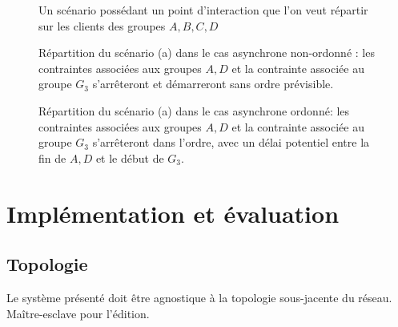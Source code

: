 \documentclass{article}
\newcommand\trigger{point d'interaction\xspace}
\begin{document}
\begin{figure}[h]
	\centering
		\begin{tikzpicture}
		
		\end{tikzpicture}
		\caption{Un scénario possédant un \trigger que l'on veut répartir sur les clients des groupes $A,B,C,D$}
	\label{scenar.depl-interactif}
\end{figure}
\begin{figure}[h]
	\centering
		\caption{Répartition du scénario (a) dans le cas asynchrone non-ordonné : les contraintes associées aux groupes $A,D$ et la contrainte associée au groupe $G_3$ s'arrêteront et démarreront sans ordre prévisible.}
\end{figure}
\begin{figure}[h]
	\centering
		\caption{Répartition du scénario (a) dans le cas asynchrone ordonné: les contraintes associées aux groupes $A,D$ et la contrainte associée au groupe $G_3$ s'arrêteront dans l'ordre, avec un délai potentiel entre la fin de $A,D$ et le début de $G_3$.}
	
\end{figure}
\FloatBarrier




\section{Implémentation et évaluation}\label{sec.evaluation}

\subsection{Topologie}
Le système présenté doit être agnostique à la topologie sous-jacente du réseau.
Maître-esclave pour l'édition.
\end{document}
